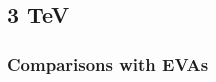 \documentclass[a4paper,11pt]{article}
\begin{document}
\clearpage
\subsection{3 TeV}




\clearpage
\subsubsection{Comparisons with EVAs}





\end{document}
